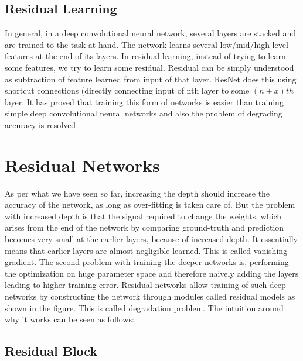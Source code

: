 \documentclass[12pt]{article}
\numberwithin{equation}{section}
\numberwithin{table}{section}
\numberwithin{figure}{section}
\begin{document}
\subsection{Residual Learning}

In general, in a deep convolutional neural network, several layers are stacked and are trained to the task at hand. The network learns several low/mid/high level features at the end of its layers. In residual learning, instead of trying to learn some features, we try to learn some residual. Residual can be simply understood as subtraction of feature learned from input of that layer. ResNet does this using shortcut connections (directly connecting input of nth layer to some $(n+x)th$ layer. It has proved that training this form of networks is easier than training simple deep convolutional neural networks and also the problem of degrading accuracy is resolved



\section{Residual Networks} \label{secreferences}


As per what we have seen so far, increasing the depth should increase the accuracy of the network, as long as over-fitting is taken care of. But the problem with increased depth is that the signal required to change the weights, which arises from the end of the network by comparing ground-truth and prediction becomes very small at the earlier layers, because of increased depth. It essentially means that earlier layers are almost negligible learned. This is called vanishing gradient. The second problem with training the deeper networks is, performing the optimization on huge parameter space and therefore naively adding the layers leading to higher training error. Residual networks allow training of such deep networks by constructing the network through modules called residual models as shown in the figure. This is called degradation problem. The intuition around why it works can be seen as follows:



\subsection{Residual Block}
\end{document}
